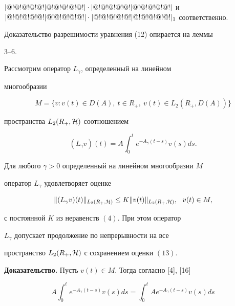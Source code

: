 $|@!@!@!@!@!|@!@!@!@!@!|\cdot |@!@!@!@!@!|@!@!@!@!@!|$ и $|@!@!@!@!@!|@!@!@!@!@!|\cdot|@!@!@!@!@!|@!@!@!@!@!|_1$ соответственно. 





Доказательство разрешимости уравнения (12) опирается на леммы


3--6.





Рассмотрим оператор $L_{\gamma }$, определенный на линейном


многообразии


$$


M=\{ v:v(t)\in D(A),\ t\in R_+,\ v(t)\in L_2(R_+,D(A))\}


$$


пространства $L_2(R_+,{\cal H} )$ соотношением


$$


(L_{\gamma }v)(t)=A\int_0^te^{-A_{\gamma }(t-s)}v(s)ds.


$$





\begin{lem}


Для любого $\gamma >0$ определенный на линейном многообразии $M$


оператор $L_{\gamma }$ удовлетворяет оценке


\begin{equation}


\|(L_{\gamma }v)(t)\|_{L_2(R_+, \pH )} \leq K \|v(t)\|_{ L_2 (R_+


, \pH )},\ \ v(t)\in M, 


\end{equation}


с постоянной $K$ из неравенств $(4)$. При этом оператор


$L_{\gamma }$ допускает продолжение по непрерывности на все


пространство $L_2(R_+,{\cal H} )$ с сохранением оценки $(13)$. 


\end{lem}





{\bf Доказательство.} Пусть $v(t)\in M$. Тогда согласно [4], [16]


\begin{equation}


A\int_0^te^{-A_{\gamma }(t-s)}v(s)ds =


\int_0^tAe^{-A_{\gamma }(t-s)}v(s)ds 


\end{equation}


